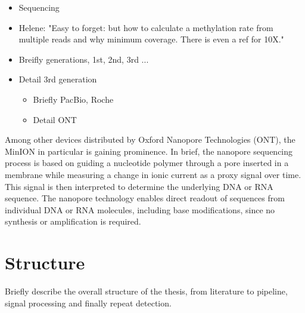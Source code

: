 \begin{itemize}
    \item Sequencing
    \item Helene: "Easy to forget: but how to calculate a methylation rate from multiple reads and why minimum coverage. There is even a ref for 10X."
    \item Breifly generations, 1st, 2nd, 3rd ...
    \item Detail 3rd generation
    \begin{itemize}
        \item Briefly PacBio, Roche
        \item Detail ONT
    \end{itemize}
\end{itemize}

Among other devices distributed by Oxford Nanopore Technologies (ONT), the MinION in particular is gaining prominence. In brief, the nanopore sequencing process is based on guiding a nucleotide polymer through a pore inserted in a membrane while measuring a change in ionic current as a proxy signal over time. This signal is then interpreted to determine the underlying DNA or RNA sequence. The nanopore technology enables direct readout of sequences from individual DNA or RNA molecules, including base modifications, since no synthesis or amplification is required.




\section{Structure}
\label{sec:intro:structure}

Briefly describe the overall structure of the thesis, from literature to pipeline, signal processing and finally repeat detection.


